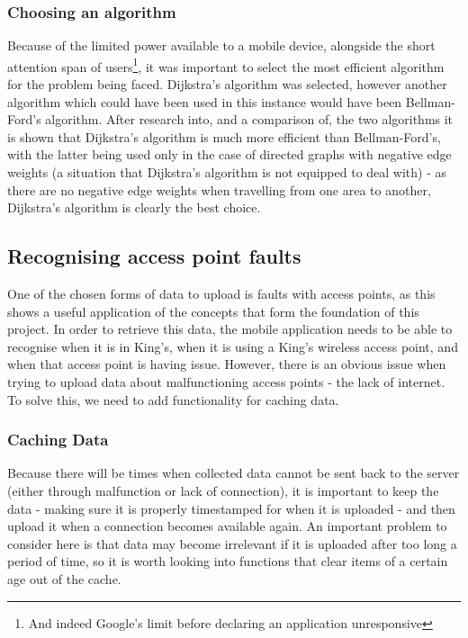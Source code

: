 \documentclass[11pt]{informatics-report}
\begin{document}
\subsubsection{Choosing an algorithm}

Because of the limited power available to a mobile device, alongside the short attention span of users\footnote{And indeed Google's limit before declaring an application unresponsive}, it was important to select the most efficient algorithm for the problem being faced. Dijkstra's algorithm was selected, however another algorithm which could have been used in this instance would have been Bellman-Ford's algorithm. After research into, and a comparison of, the two algorithms it is shown that Dijkstra's algorithm is much more efficient than Bellman-Ford's\cite{thippeswamystudy}, with the latter being used only in the case of directed graphs with negative edge weights (a situation that Dijkstra's algorithm is not equipped to deal with) - as there are no negative edge weights when travelling from one area to another, Dijkstra's algorithm is clearly the best choice.

\subsection{Recognising access point faults}

One of the chosen forms of data to upload is faults with access points, as this shows a useful application of the concepts that form the foundation of this project. In order to retrieve this data, the mobile application needs to be able to recognise when it is in King's, when it is using a King's wireless access point, and when that access point is having issue. However, there is an obvious issue when trying to upload data about malfunctioning access points - the lack of internet. To solve this, we need to add functionality for caching data.

\subsubsection{Caching Data}

Because there will be times when collected data cannot be sent back to the server (either through malfunction or lack of connection), it is important to keep the data - making sure it is properly timestamped for when it is uploaded - and then upload it when a connection becomes available again. An important problem to consider here is that data may become irrelevant if it is uploaded after too long a period of time, so it is worth looking into functions that clear items of a certain age out of the cache. 
\end{document}
